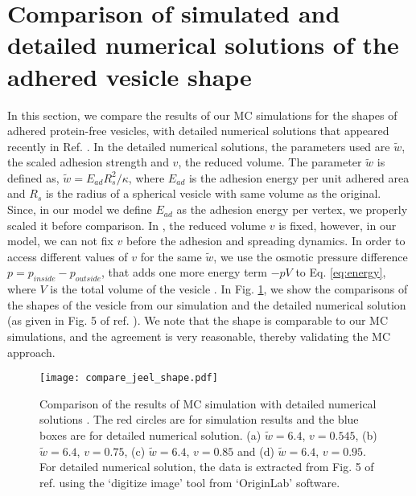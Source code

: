 \documentclass[pre,amsmath]{revtex4}
\begin{document}
\section{Comparison of simulated and detailed numerical solutions of the adhered vesicle shape}
\label{sec:jeel}
In this section, we compare the results of our MC simulations for the shapes of adhered protein-free vesicles, with detailed numerical solutions that appeared recently in Ref. \cite{raval2020shape,bibissidis2020}. In the detailed numerical solutions, the parameters used are $\tilde{w}$, the scaled adhesion strength and $v$, the reduced volume. The parameter $\tilde{w}$ is defined as, $\tilde{w}=E_{ad} R_s^2/\kappa$, where $E_{ad}$ is the adhesion energy per unit adhered area and $R_s$ is the radius of a spherical vesicle with same volume as the original. Since, in our model we define $E_{ad}$ as the adhesion energy per vertex, we properly scaled it before comparison. In \cite{raval2020shape,bibissidis2020}, the reduced volume $v$ is fixed, however, in our model, we can not fix $v$ before the adhesion and spreading dynamics. In order to access different values of $v$ for the same $\tilde{w}$, we use the osmotic pressure difference $p = p_{inside} - p_{outside}$, that adds one more energy term $-p V$ to Eq. \ref{eq:energy}, where $V$ is the total volume of the vesicle \cite{miha2019}. In Fig. \ref{compare_jeel}, we show the comparisons of the shapes of the vesicle from our simulation and the detailed numerical solution (as given in Fig. 5 of ref. \cite{bibissidis2020}). We note that the shape is comparable to our MC simulations, and the agreement is very reasonable, thereby validating the MC approach. 
\begin{figure}[ht]
\centering
\texttt{[image: compare\_jeel\_shape.pdf]}
\caption{Comparison of the results of MC simulation with detailed numerical solutions \cite{raval2020shape,bibissidis2020}. The red circles are for simulation results and the blue boxes are for detailed numerical solution. (a) $\tilde{w}=6.4$, $v=0.545$, (b) $\tilde{w}=6.4$, $v=0.75$, (c) $\tilde{w}=6.4$, $v=0.85$ and (d) $\tilde{w}=6.4$, $v=0.95$. For detailed numerical solution, the data is extracted from Fig. 5 of ref. \cite{bibissidis2020} using the `digitize image' tool from `OriginLab' software.}
\label{compare_jeel} 
\end{figure}

\end{document}
